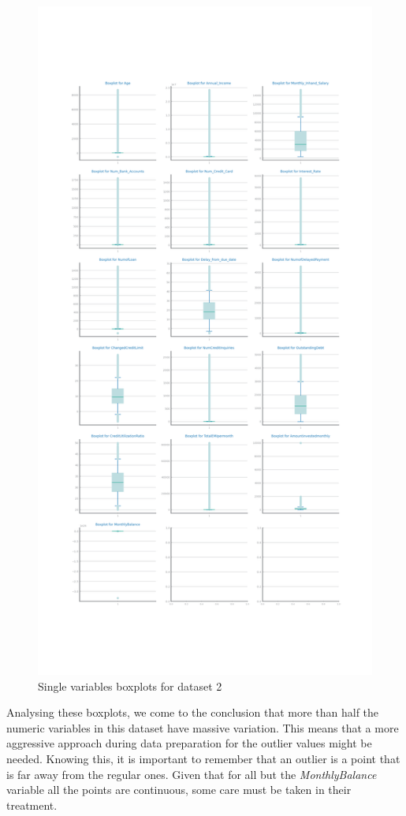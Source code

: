 \documentclass[10pt]{extarticle}
\begin{document}
\begin{figure}[H]
\centering\includegraphics[scale=0.35]{images/dataset2/data_profiling/Credit_Score_single_boxplots.png}
\caption{Single variables boxplots for dataset 2}
\end{figure}
Analysing these boxplots, we come to the conclusion that more than half the numeric variables in this dataset have massive variation.
This means that a more aggressive approach during data preparation for the outlier values might be needed. Knowing this, it is important
to remember that an outlier is a point that is far away from the regular ones. Given that for all but the \textit{MonthlyBalance} 
variable all the points are continuous, some care must be taken in their treatment.
\end{document}
